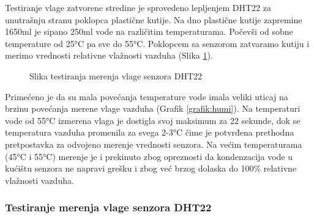 \documentclass[a4paper, 12pt]{article}
\begin{document}
\vspace{10pt}	
		
Testiranje vlage zatvorene stredine je sprovedeno lepljenjem DHT22 za unutrašnju stranu poklopca plastične kutije. Na dno plastične kutije zapremine 1650ml je sipano 250ml vode na različitim temperaturama. Počevši od sobne temperature od 25°C pa sve do 55°C. Poklopcem sa senzorom zatvaramo kutiju i merimo vrednosti relativne vlažnosti vazduha (Slika \ref{fig:test_vlaga}).

\vspace{10pt}

\begin{figure}[H]
\centering
{}
\caption{Slika testiranja merenja vlage senzora DHT22} \label{fig:test_vlaga}
\end{figure}

\pagebreak

\sloppypar
Primećeno je da su mala povećanja temperature vode imala veliki uticaj na brzinu povećanja merene vlage vazduha (Grafik \ref{grafik:humi}). Na temperaturi vode od 55°C izmerena vlaga je dostigla svoj maksimum za 22 sekunde, dok se temperatura vazduha promenila za svega 2-3°C čime je potvrđena prethodna pretpostavka za odvojeno merenje vrednosti senzora. Na većim temperaturama (45°C i 55°C) merenje je i prekinuto zbog opreznosti da kondenzacija vode u kućištu senzora ne napravi grešku i zbog već brzog dolaska do 100\% relativne vlažnosti vazduha.

\vspace{10pt}


		\subsubsection*{Testiranje merenja vlage senzora DHT22}

\vspace{10pt}
\end{document}
